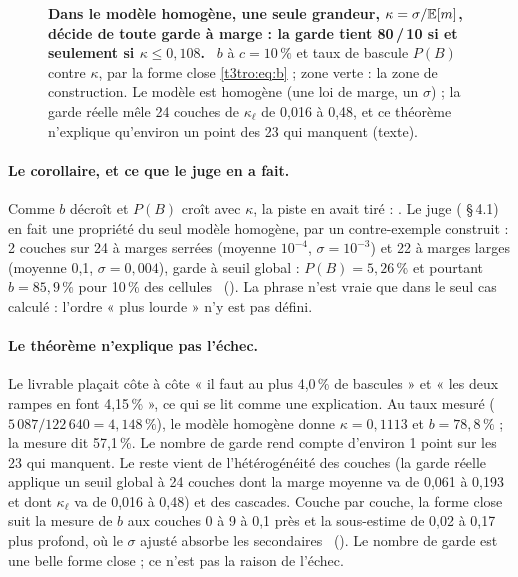 \begin{figure}[tbp]
\centering
\GrapheTropicaleKappa
\caption[Le théorème du nombre de garde]{\textbf{Dans le modèle homogène, une seule grandeur, $\kappa = \sigma/\mathbb{E}[m]$, décide de toute garde à marge : la garde tient 80\,/\,10 si et seulement si $\kappa \le 0{,}108$.} \calc~$b$ à $c = 10\,\%$ et taux de bascule $P(B)$ contre $\kappa$, par la forme close \eqref{t3tro:eq:b} ; zone verte : la zone de construction. Le modèle est homogène (une loi de marge, un $\sigma$) ; la garde réelle mêle 24 couches de $\kappa_\ell$ de 0,016 à 0,48, et ce théorème n'explique qu'environ un point des 23 qui manquent (texte). }
\label{fig:t3-trop-kappa}
\end{figure}

\paragraph{Le corollaire, et ce que le juge en a fait.} Comme $b$ décroît et $P(B)$ croît avec $\kappa$, la piste en avait tiré : . Le juge ( §\,4.1) en fait une propriété du seul modèle homogène, par un contre-exemple construit : 2 couches sur 24 à marges serrées (moyenne $10^{-4}$, $\sigma = 10^{-3}$) et 22 à marges larges (moyenne 0,1, $\sigma = 0{,}004$), garde à seuil global : $P(B) = 5{,}26\,\%$ et pourtant $b = 85{,}9\,\%$ pour 10\,\% des cellules \calc~(). La phrase  n'est vraie que dans le seul cas calculé : l'ordre « plus lourde » n'y est pas défini.

\paragraph{Le théorème n'explique pas l'échec.} Le livrable plaçait côte à côte « il faut au plus 4,0\,\% de bascules » et « les deux rampes en font 4,15\,\% », ce qui se lit comme une explication. Au taux mesuré ($5\,087/122\,640 = 4{,}148\,\%$), le modèle homogène donne $\kappa = 0{,}1113$ et $b = 78{,}8\,\%$ ; la mesure dit 57,1\,\%. Le nombre de garde rend compte d'environ 1 point sur les 23 qui manquent. Le reste vient de l'hétérogénéité des couches (la garde réelle applique un seuil global à 24 couches dont la marge moyenne va de 0,061 à 0,193 et dont $\kappa_\ell$ va de 0,016 à 0,48) et des cascades. Couche par couche, la forme close suit la mesure de $b$ aux couches 0 à 9 à 0,1 près et la sous-estime de 0,02 à 0,17 plus profond, où le $\sigma$ ajusté absorbe les secondaires \mes~(). Le nombre de garde est une belle forme close ; ce n'est pas la raison de l'échec.

